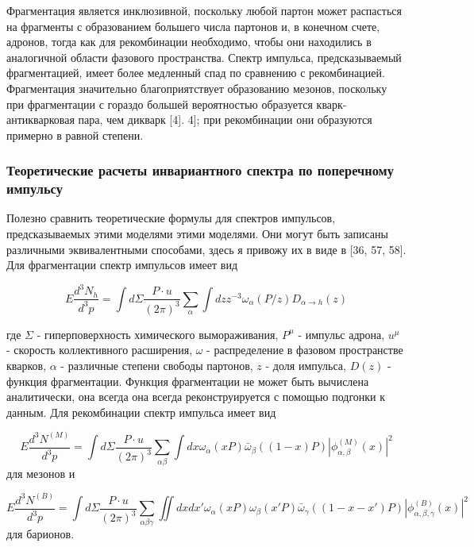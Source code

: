 Фрагментация является инклюзивной, поскольку любой партон может распасться на фрагменты с образованием большего числа партонов и, в конечном счете, адронов, тогда как для рекомбинации необходимо, чтобы они находились в аналогичной области фазового пространства. Спектр импульса, предсказываемый фрагментацией, имеет более медленный спад по сравнению с рекомбинацией. Фрагментация значительно благоприятствует образованию мезонов, поскольку при фрагментации с гораздо большей вероятностью образуется кварк-антикварковая пара, чем дикварк [4]. 4]; при рекомбинации они образуются примерно в равной степени.

\subsubsection{Теоретические расчеты инвариантного спектра по поперечному импульсу}
Полезно сравнить теоретические формулы для спектров импульсов, предсказываемых этими моделями этими моделями. Они могут быть записаны различными эквивалентными способами, здесь я привожу их в виде в [36, 57, 58]. Для фрагментации спектр импульсов имеет вид

\begin{equation}
	E \frac{d^3 N_h}{d^3p} = \int d\Sigma \frac{P\cdot u}{(2 \pi)^3} \sum_{\alpha}\int dz z^{-3} \omega_{\alpha}(P/z)D_{\alpha \rightarrow h}(z)
\end{equation}	

где $\Sigma$ - гиперповерхность химического вымораживания, $P^{\mu}$ - импульс адрона, $u^{\mu}$ - скорость коллективного расширения, $\omega$ - распределение в фазовом пространстве кварков, $\alpha$ - различные степени свободы партонов, $z$ - доля импульса, $D(z)$ - функция фрагментации. Функция фрагментации не может быть вычислена аналитически, она всегда она всегда реконструируется с помощью подгонки к данным. Для рекомбинации спектр импульса имеет вид

\begin{equation}
	E \frac{d^3 N^{(M)}}{d^3p} = \int d\Sigma \frac{P\cdot u}{(2 \pi)^3} \sum_{\alpha \beta}\int dx\omega_{\alpha}(xP)\bar{\omega}_{\beta}((1-x)P) |\phi^{(M)}_{\alpha, \beta}(x)|^2
\end{equation}	
для мезонов и 

\begin{equation}
	E \frac{d^3 N^{(B)}}{d^3p} = \int d\Sigma \frac{P\cdot u}{(2 \pi)^3} \sum_{\alpha \beta \gamma}\iint dx dx' \omega_{\alpha}(xP) \omega_{\beta}(x'P) \bar{\omega}_{\gamma}((1-x-x')P) |\phi^{(B)}_{\alpha, \beta, \gamma}(x)|^2
\end{equation}	
для барионов.

